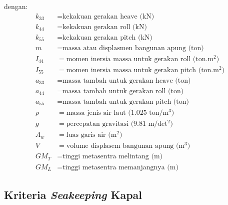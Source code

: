 dengan:
\begin{align*}
k_{33} & = \text{kekakuan gerakan heave (kN)} \\
k_{44} & = \text{kekakuan gerakan roll (kN)} \\
k_{55} & = \text{kekakuan gerakan pitch (kN)} \\
m & = \text{massa atau displasmen bangunan apung (ton)} \\
I_{44} & = \text{momen inersia massa untuk gerakan roll (ton.m$^2$)} \\
I_{55} & = \text{momen inersia massa untuk gerakan pitch (ton.m$^2$)} \\
a_{33} & = \text{massa tambah untuk gerakan heave (ton)} \\
a_{44} & = \text{massa tambah untuk gerakan roll (ton)} \\
a_{55} & = \text{massa tambah untuk gerakan pitch (ton)} \\
\rho & = \text{massa jenis air laut (1.025 ton/m$^3$)} \\
g & = \text{percepatan gravitasi (9.81 m/det$^2$)} \\
A_w & = \text{luas garis air (m$^2$)} \\
V & = \text{volume displasem bangunan apung (m$^3$)} \\
GM_T & = \text{tinggi metasentra melintang (m)} \\
GM_L & = \text{tinggi metasentra memanjangnya (m)}
\end{align*}

\subsection{Kriteria \emph{Seakeeping} Kapal}
\label{subsec:kriteria-seakeeping}